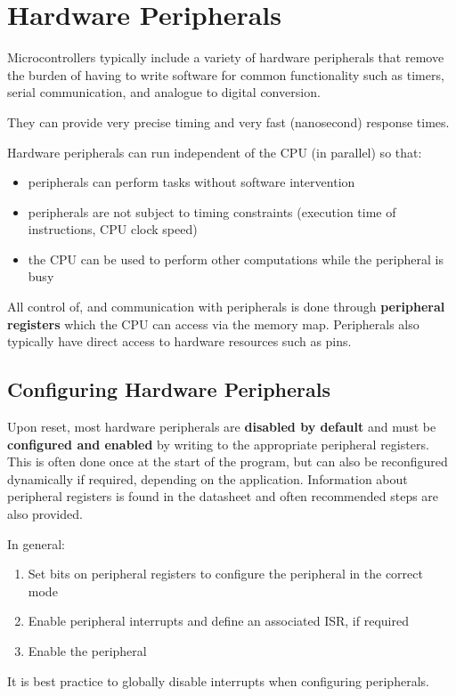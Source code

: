 \documentclass[a4paper]{report}
\begin{document}
\chapter{Hardware Peripherals}
Microcontrollers typically include a variety of hardware peripherals
that remove the burden of having to write software for common
functionality such as timers, serial communication, and analogue to
digital conversion.

They can provide very precise timing and very fast (nanosecond)
response times.

Hardware peripherals can run independent of the CPU (in parallel) so
that:
\begin{itemize}
    \item peripherals can perform tasks without software intervention
    \item peripherals are not subject to timing constraints (execution
          time of instructions, CPU clock speed)
    \item the CPU can be used to perform other computations while the
          peripheral is busy
\end{itemize}
All control of, and communication with peripherals is done through \textbf{peripheral registers}
which the CPU can access via the memory map. Peripherals also typically have direct access
to hardware resources such as pins.
\section{Configuring Hardware Peripherals}
Upon reset, most hardware peripherals are \textbf{disabled by default}
and must be \textbf{configured and enabled} by writing to the
appropriate peripheral registers. This is often done once at the start
of the program, but can also be reconfigured dynamically if required,
depending on the application. Information about peripheral registers is
found in the datasheet and often recommended steps are also provided.

In general:
\begin{enumerate}
    \item Set bits on peripheral registers to configure the peripheral
          in the correct mode
    \item Enable peripheral interrupts and define an associated ISR, if
          required
    \item Enable the peripheral
\end{enumerate}
It is best practice to globally disable interrupts when configuring peripherals.
\end{document}
